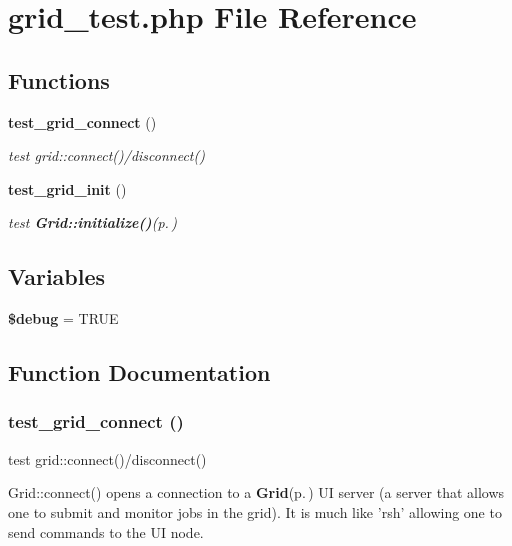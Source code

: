 \section{grid\_\-test.php File Reference}
\label{test_2grid__test_8php}
\subsection*{Functions}
\begin{CompactItemize}
\item 
{\bf test\_\-grid\_\-connect} ()
\begin{CompactList}\small\item\em test grid::connect()/disconnect() \item\end{CompactList}\item 
{\bf test\_\-grid\_\-init} ()
\begin{CompactList}\small\item\em test {\bf Grid::initialize()}{\rm (p.\,\pageref{classGrid_a18})} \item\end{CompactList}\end{CompactItemize}
\subsection*{Variables}
\begin{CompactItemize}
\item 
{\bf \$debug} = TRUE
\end{CompactItemize}


\subsection{Function Documentation}
\subsubsection{\setlength{\rightskip}{0pt plus 5cm}test\_\-grid\_\-connect ()}\label{test_2grid__test_8php_a1}


test grid::connect()/disconnect() 

Grid::connect() opens a connection to a {\bf Grid}{\rm (p.\,\pageref{classGrid})} UI server (a server that allows one to submit and monitor jobs in the grid). It is much like 'rsh' allowing one to send commands to the UI node.

